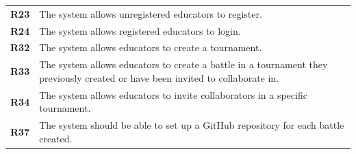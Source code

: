 \documentclass[12pt, a4paper]{report}
\begin{document}
\begin{table}[H]
\begin{tabularx}{\textwidth}{cX}
        \textbf{R23} & The system allows unregistered educators to register.                                                                            \\
        \textbf{R24} & The system allows registered educators to login.                                                                                 \\
        \textbf{R32} & The system allows educators to create a tournament.                                                                              \\
        \textbf{R33} & The system allows educators to create a battle in a tournament they previously created or have been invited to collaborate in.   \\
        \textbf{R34} & The system allows educators to invite collaborators in a specific tournament.                                                    \\
        \textbf{R37} & The system should be able to set up a GitHub repository for each battle created.                                                 \\                                              
        \end{tabularx}
    \end{table}
\end{document}
